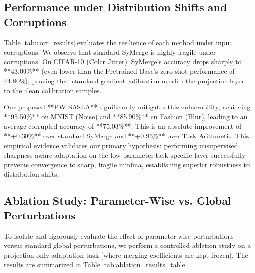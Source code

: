 \documentclass{article}
\theoremstyle{plain}
\theoremstyle{definition}
\theoremstyle{remark}
\begin{document}
\subsection{Performance under Distribution Shifts and Corruptions}
Table \ref{tab:corr_results} evaluates the resilience of each method under input corruptions. We observe that standard SyMerge is highly fragile under corruptions. On CIFAR-10 (Color Jitter), SyMerge's accuracy drops sharply to **43.00\%** (even lower than the Pretrained Base's zero-shot performance of $44.80\%$), proving that standard gradient calibration overfits the projection layer to the clean calibration samples.

Our proposed **PW-SASLA** significantly mitigates this vulnerability, achieving **95.50\%** on MNIST (Noise) and **85.90\%** on Fashion (Blur), leading to an average corrupted accuracy of **75.03\%**. This is an absolute improvement of **+0.30\%** over standard SyMerge and **+0.93\%** over Task Arithmetic. This empirical evidence validates our primary hypothesis: performing unsupervised sharpness-aware adaptation on the low-parameter task-specific layer successfully prevents convergence to sharp, fragile minima, establishing superior robustness to distribution shifts.

\subsection{Ablation Study: Parameter-Wise vs. Global Perturbations}
To isolate and rigorously evaluate the effect of parameter-wise perturbations versus standard global perturbations, we perform a controlled ablation study on a projection-only adaptation task (where merging coefficients are kept frozen). The results are summarized in Table \ref{tab:ablation_results_table}.
\end{document}
